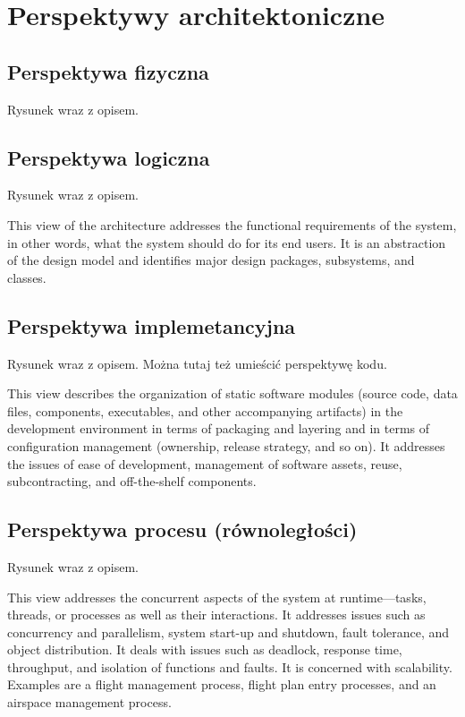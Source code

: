 \section{Perspektywy architektoniczne}
\label{Chapter54}

\subsection{Perspektywa fizyczna}

Rysunek wraz z opisem.

\subsection{Perspektywa logiczna}

Rysunek wraz z opisem.

This view of the architecture addresses the functional requirements of the system, in other words, what the system should do for its end users. It is an abstraction of the design model and identifies major design packages, subsystems, and classes.


\subsection{Perspektywa implemetancyjna}

Rysunek wraz z opisem. Można tutaj też umieścić perspektywę kodu.

This view describes the organization of static software modules (source code, data files, components, executables, and other accompanying artifacts) in the development environment in terms of packaging and layering and in terms of configuration management (ownership, release strategy, and so on). It addresses the issues of ease of development, management of software assets, reuse, subcontracting, and off-the-shelf components.


\subsection{Perspektywa procesu (równoległości)}

Rysunek wraz z opisem.

This view addresses the concurrent aspects of the system at runtime—tasks, threads, or processes as well as their interactions. It addresses issues such as concurrency and parallelism, system start-up and shutdown, fault tolerance, and object distribution. It deals with issues such as deadlock, response time, throughput, and isolation of functions and faults. It is concerned with scalability.
Examples are a flight management process, flight plan entry processes, and an airspace management process.


